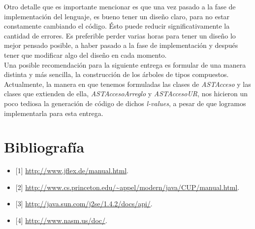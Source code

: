 \documentclass[11pt, spanish]{report}
\begin{document}
Otro detalle que es importante mencionar es que una vez pasado a la fase de implementaci\'on del lenguaje, es bueno tener un dise\~no claro, para no estar constamente 
cambiando el c\'odigo. \'Esto puede reducir significativamente la cantidad de errores. Es preferible perder varias horas para tener un dise\~no lo mejor pensado posible, 
a haber pasado a la fase de implementaci\'on y despu\'es tener que modificar algo del dise\~no en cada momento.\\

Una posible recomendaci\'on para la siguiente entrega es formular de una manera distinta y m\'as sencilla, la construcci\'on de los \'arboles de tipos compuestos.
Actualmente, la manera en que tenemos formuladas las clases de \emph{ASTAcceso} y las clases que extienden de ella, \emph{ASTAccesoArreglo} y \emph{ASTAccesoUR}, 
nos hicieron un poco tediosa la generaci\'on de c\'odigo de dichos \emph{l-values}, a pesar de que logramos implementarla para esta entrega.

\chapter{Bibliograf\'ia}
\begin{itemize}
\item{[1]} \url{http://www.jflex.de/manual.html}.

\item{[2]} \url{http://www.cs.princeton.edu/~appel/modern/java/CUP/manual.html}.

\item{[3]} \url{http://java.sun.com/j2se/1.4.2/docs/api/}.

\item{[4]} \url{http://www.nasm.us/doc/}.
\end{itemize}
\end{document}
